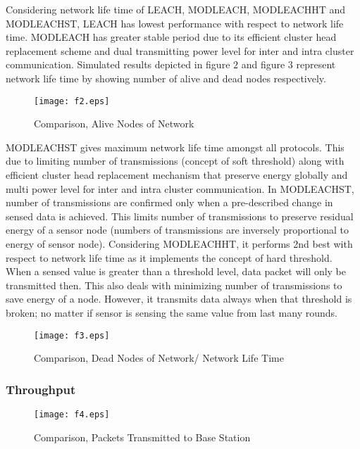 \documentclass[10pt, conference, compsocconf]{IEEEtran}
\begin{document}
Considering network life time of LEACH, MODLEACH, MODLEACHHT and MODLEACHST, LEACH has lowest performance with respect to network life time. MODLEACH has greater stable period due to its efficient cluster head replacement scheme and dual transmitting power level for inter and intra cluster communication. Simulated results depicted in figure $2$ and figure $3$ represent network life time by showing number of alive and dead nodes respectively.

\begin{figure}
\begin{center}
\texttt{[image: f2.eps]}
\caption{Comparison, Alive Nodes of Network}
\end{center}
\end{figure}

MODLEACHST gives maximum network life time amongst all protocols. This due to limiting number of transmissions (concept of soft threshold) along with efficient cluster head replacement mechanism that preserve energy globally and multi power level for inter and intra cluster communication. In MODLEACHST, number of transmissions are confirmed only when a pre-described change in sensed data is achieved. This limits number of transmissions to preserve residual energy of a sensor node (numbers of transmissions are inversely proportional to energy of sensor node). Considering MODLEACHHT, it performs 2nd best with respect to network life time as it implements the concept of hard threshold. When a sensed value is greater than a threshold level, data packet will only be transmitted then. This also deals with minimizing number of transmissions to save energy of a node. However, it transmits data always when that threshold is broken; no matter if sensor is sensing the same value from last many rounds.

\begin{figure}
\begin{center}
\texttt{[image: f3.eps]}
\caption{Comparison, Dead Nodes of Network/ Network Life Time}
\end{center}
\end{figure}

\subsubsection{Throughput}

\begin{figure}
\begin{center}
\texttt{[image: f4.eps]}
\caption{Comparison, Packets Transmitted to Base Station}
\end{center}
\end{figure}
\end{document}
